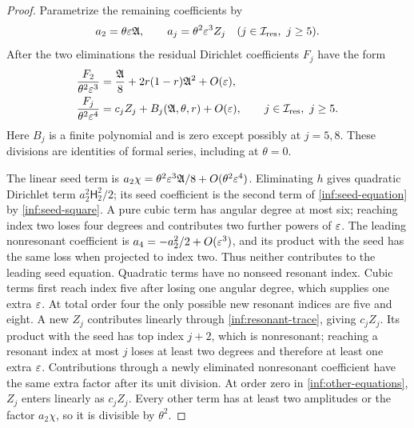 \begin{proof}
Parametrize the remaining coefficients by
\begin{equation}\label{inf:resonant-scaling}
 a_2=\theta\eps \SeedA,\qquad
 a_j=\theta^2\eps^3 Z_j\quad(j\in\mathcal I_{\mathrm{res}},\ j\ge5).
\end{equation}
After the two eliminations the residual Dirichlet coefficients
$F_j$ have the form
\begin{align}
 \frac{F_2}{\theta^2\varepsilon^3}
 &=\frac{\mathfrak A}{8}+2r(1-r)\mathfrak A^2+O(\varepsilon),\label{inf:seed-equation}\\
 \frac{F_j}{\theta^2\varepsilon^4}
 &=c_jZ_j+B_j(\mathfrak A,\theta,r)+O(\varepsilon),
 \qquad j\in\mathcal I_{\mathrm{res}},\ j\ge5.\label{inf:other-equations}
\end{align}
Here $B_j$ is a finite polynomial and is zero except possibly at
$j=5,8$. These divisions are identities of formal series, including
at $\theta=0$.

The linear seed term is
$a_2\chi=\theta^2\varepsilon^3 \mathfrak A/8+O(\theta^2\varepsilon^4)$.
Eliminating $h$ gives quadratic Dirichlet term
$a_2^2\mathsf H_2^2/2$; its seed coefficient is the second term of
\eqref{inf:seed-equation} by \eqref{inf:seed-square}.
A pure cubic term has angular degree at most six; reaching index two
loses four degrees and contributes two further powers of $\varepsilon$.
The leading nonresonant coefficient is $a_4=-a_2^2/2+O(\varepsilon^3)$,
and its product with the seed has the same loss when projected to
index two. Thus neither contributes to the leading seed equation.
Quadratic terms have no nonseed resonant index. Cubic terms first
reach index five after losing one angular degree, which supplies one
extra $\varepsilon$. At total order four the only possible new resonant
indices are five and eight. A new $Z_j$ contributes linearly through
\eqref{inf:resonant-trace}, giving $c_jZ_j$.
Its product with the seed has top index $j+2$, which is nonresonant;
reaching a resonant index at most $j$ loses at least two degrees and
therefore at least one extra $\varepsilon$. Contributions through a newly
eliminated nonresonant coefficient have the same extra factor after
its unit division. At order zero in \eqref{inf:other-equations},
$Z_j$ enters linearly as $c_jZ_j$. Every other term has at least two
amplitudes or the factor $a_2\chi$, so it is divisible by $\theta^2$.


\end{proof}
